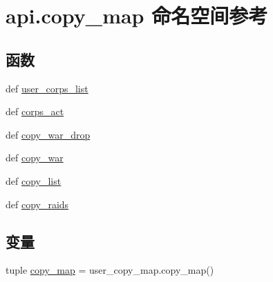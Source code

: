 \hypertarget{namespaceapi_1_1copy__map}{\section{api.\-copy\-\_\-map 命名空间参考}
\label{namespaceapi_1_1copy__map}
}
\subsection*{函数}
\begin{DoxyCompactItemize}
\item 
def \hyperlink{namespaceapi_1_1copy__map_ae26486a7095180402ae256c51683ea37}{user\-\_\-corps\-\_\-list}
\item 
def \hyperlink{namespaceapi_1_1copy__map_a1fbbd8ab2aa79eb95776cf411b29eab7}{corps\-\_\-act}
\item 
def \hyperlink{namespaceapi_1_1copy__map_aa21dfd97f11efec3c57e7d907d1d7078}{copy\-\_\-war\-\_\-drop}
\item 
def \hyperlink{namespaceapi_1_1copy__map_af866dabbfc330e6ac0247060e8502660}{copy\-\_\-war}
\item 
def \hyperlink{namespaceapi_1_1copy__map_a51d0dd9a9dcdca6626a1dbefcb5a7ded}{copy\-\_\-list}
\item 
def \hyperlink{namespaceapi_1_1copy__map_a74ed814c584100c36558cee0cc3c8782}{copy\-\_\-raids}
\end{DoxyCompactItemize}
\subsection*{变量}
\begin{DoxyCompactItemize}
\item 
tuple \hyperlink{namespaceapi_1_1copy__map_adafe0fc38f47f3c39bd580678dae0e95}{copy\-\_\-map} = user\-\_\-copy\-\_\-map.\-copy\-\_\-map()
\end{DoxyCompactItemize}


